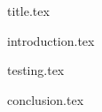 \documentclass[a4paper,12pt]{article}
\begin{document}
{title.tex}

\newpage

\newpage
\vfill
\tableofcontents
\vfill
\newpage
\listoffigures

\newpage
{}

{introduction.tex}




{testing.tex}

{conclusion.tex}
\end{document}
